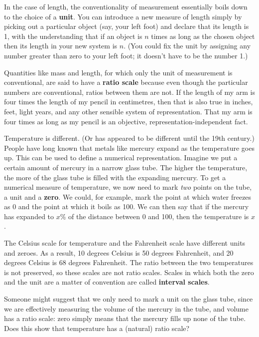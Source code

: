 In the case of length, the conventionality of measurement essentially boils down
to the choice of a \textbf{unit}. You can introduce a new measure of length
simply by picking out a particular object (say, your left foot) and declare that
its length is 1, with the understanding that if an object is $n$ times as long
as the chosen object then its length in your new system is $n$. (You could fix
the unit by assigning any number greater than zero to your left foot; it doesn't
have to be the number 1.)

Quantities like mass and length, for which only the unit of measurement is
conventional, are said to have a \textbf{ratio scale} because even though the
particular numbers are conventional, ratios between them are not. If the length
of my arm is four times the length of my pencil in centimetres, then that is
also true in inches, feet, light years, and any other sensible system of
representation. That my arm is four times as long as my pencil is an objective,
representation-independent fact.

Temperature is different. (Or has appeared to be different until the 19th
century.) People have long known that metals like mercury expand as the
temperature goes up. This can be used to define a numerical representation.
Imagine we put a certain amount of mercury in a narrow glass tube. The higher
the temperature, the more of the glass tube is filled with the expanding
mercury. To get a numerical measure of temperature, we now need to mark
\emph{two} points on the tube, a unit and a \textbf{zero}. We could, for
example, mark the point at which water freezes as 0 and the point at which it
boils as 100. We can then say that if the mercury has expanded to $x\%$ of the
distance between 0 and 100, then the temperature is $x$.

The Celsius scale for temperature and the Fahrenheit scale have different units
and zeroes. As a result, 10 degrees Celsius is 50 degrees Fahrenheit, and 20
degrees Celsius is 68 degrees Fahrenheit. The ratio between the two temperatures
is not preserved, so these scales are not ratio scales. Scales in which both the
zero and the unit are a matter of convention are called \textbf{interval
  scales}.

\begin{exercise}{2}
  Someone might suggest that we only need to mark a unit on the glass tube,
  since we are effectively measuring the volume of the mercury in the tube, and
  volume has a ratio scale: zero simply means that the mercury fills up none of
  the tube. Does this show that temperature has a (natural) ratio scale?
\end{exercise}

